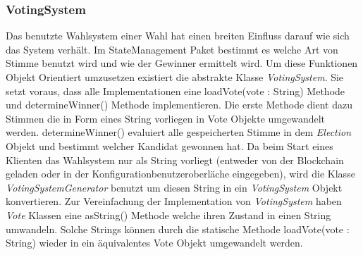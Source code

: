 \documentclass[parskip=full]{scrartcl}
\begin{document}
	\subsubsection{VotingSystem}
	Das benutzte Wahlsystem einer Wahl hat einen breiten Einfluss darauf wie sich das System verhält. Im StateManagement Paket bestimmt es welche Art von Stimme benutzt wird und wie der Gewinner ermittelt wird.
	Um diese Funktionen Objekt Orientiert umzusetzen existiert die abstrakte Klasse \textit{VotingSystem}. Sie setzt voraus, dass alle Implementationen eine loadVote(vote : String) Methode und determineWinner() Methode implementieren. Die erste Methode dient dazu Stimmen die in Form eines String vorliegen in Vote Objekte umgewandelt werden. determineWinner() evaluiert alle gespeicherten Stimme in dem \textit{Election} Objekt und bestimmt welcher Kandidat gewonnen hat.
	Da beim Start eines Klienten das Wahlsystem nur als String vorliegt (entweder von der Blockchain geladen oder in der Konfigurationbenutzeroberläche eingegeben), wird die Klasse \textit{VotingSystemGenerator} benutzt um diesen String in ein \textit{VotingSystem} Objekt konvertieren.
	Zur Vereinfachung der Implementation von \textit{VotingSystem} haben \textit{Vote} Klassen eine asString() Methode welche ihren Zustand in einen String umwandeln. Solche Strings können durch die statische Methode loadVote(vote : String) wieder in ein äquivalentes Vote Objekt umgewandelt werden.
	
	\newpage
	
\end{document}
